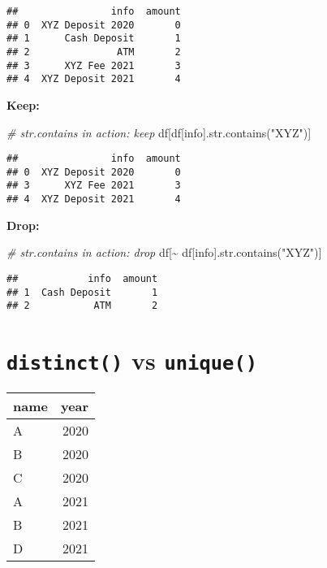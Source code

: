 \documentclass[
]{book}
\newenvironment{Shaded}{\begin{snugshade}}{\end{snugshade}}
\newcommand{\BuiltInTok}[1]{#1}
\newcommand{\CommentTok}[1]{\textcolor[rgb]{0.56,0.35,0.01}{\textit{#1}}}
\newcommand{\NormalTok}[1]{#1}
\newcommand{\OperatorTok}[1]{\textcolor[rgb]{0.81,0.36,0.00}{\textbf{#1}}}
\newcommand{\StringTok}[1]{\textcolor[rgb]{0.31,0.60,0.02}{#1}}
\begin{document}
\begin{verbatim}
##                info  amount
## 0  XYZ Deposit 2020       0
## 1      Cash Deposit       1
## 2               ATM       2
## 3      XYZ Fee 2021       3
## 4  XYZ Deposit 2021       4
\end{verbatim}

\textbf{Keep:}

\begin{Shaded}
\begin{Highlighting}[]
\CommentTok{\# str.contains in action: keep}
\NormalTok{df[df[}\StringTok{\textquotesingle{}info\textquotesingle{}}\NormalTok{].}\BuiltInTok{str}\NormalTok{.contains(}\StringTok{"XYZ"}\NormalTok{)]}
\end{Highlighting}
\end{Shaded}

\begin{verbatim}
##                info  amount
## 0  XYZ Deposit 2020       0
## 3      XYZ Fee 2021       3
## 4  XYZ Deposit 2021       4
\end{verbatim}

\textbf{Drop:}

\begin{Shaded}
\begin{Highlighting}[]
\CommentTok{\# str.contains in action: drop}
\NormalTok{df[}\OperatorTok{\textasciitilde{}}\NormalTok{ df[}\StringTok{\textquotesingle{}info\textquotesingle{}}\NormalTok{].}\BuiltInTok{str}\NormalTok{.contains(}\StringTok{"XYZ"}\NormalTok{)]}
\end{Highlighting}
\end{Shaded}

\begin{verbatim}
##            info  amount
## 1  Cash Deposit       1
## 2           ATM       2
\end{verbatim}

\hypertarget{distinct-vs-unique}{%
\section{\texorpdfstring{\texttt{distinct()} vs \texttt{unique()}}{distinct() vs unique()}}\label{distinct-vs-unique}}

\begin{longtable}[]{@{}lr@{}}
\toprule
name & year \\
\midrule
\endhead
A & 2020 \\
B & 2020 \\
C & 2020 \\
A & 2021 \\
B & 2021 \\
D & 2021 \\
\bottomrule
\end{longtable}
\end{document}
